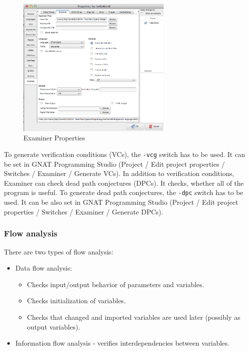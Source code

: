 \begin{figure}[ht]%
    \begin{center}
    	\includegraphics[width=3in]{figures/Properties-Switches-Examiner.png}    	
    \end{center}
    \caption{Examiner Properties}
    \label{figure:examinerproperties}
\end{figure}

To generate verification conditions (VCs), the \lstinline{-vcg} switch has to be used. It can be set in GNAT Programming Studio (Project / Edit project properties / Switches / Examiner / Generate VCs).
In addition to verification conditions, Examiner can check dead path conjectures (DPCs). It checks, whether all of the program is useful. To generate dead path conjectures, the \lstinline{-dpc} switch has to be used. It can be also set in GNAT Programming Studio (Project / Edit project properties / Switches / Examiner / Generate DPCs).


\subsubsection{Flow analysis}
\label{verification:examiner:flowanalysis}
There are two types of flow analysis:
\begin{itemize}
	\item Data flow analysis:
	\begin{itemize}
		\item Checks input/output behavior of parameters and variables.
		\item Checks initialization of variables.
		\item Checks that changed and imported variables are used later (possibly as output variables).
	\end{itemize}
	\item Information flow analysis - verifies interdependencies between variables.
\end{itemize}

